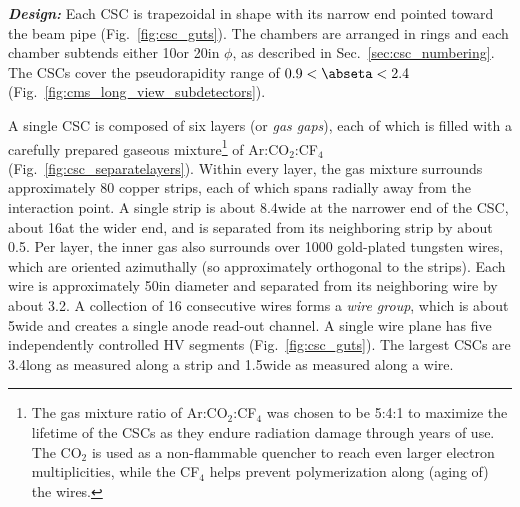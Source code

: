 \textit{\textbf{Design:}}
Each CSC is trapezoidal in shape with its narrow end pointed toward the beam pipe (Fig.~\ref{fig:csc_guts}).
The chambers are arranged in rings and each chamber subtends either 10\degrees or 20\degrees in $\phi$, as described in Sec.~\ref{sec:csc_numbering}.
The CSCs cover the pseudorapidity range of $0.9 < \abseta < 2.4$ (Fig.~\ref{fig:cms_long_view_subdetectors}).

A single CSC is composed of six layers (or \emph{gas gaps}), each of which is filled with a carefully prepared gaseous mixture\footnote{
    The gas mixture ratio of Ar:CO$_{2}$:CF$_{4}$ was chosen to be 5:4:1 to maximize the lifetime of the CSCs as they endure radiation damage through years of use.
    The CO$_{2}$ is used as a non-flammable quencher to reach even larger electron multiplicities, while the CF$_{4}$ helps prevent polymerization along (aging of) the wires.
    }
of Ar:CO$_{2}$:CF$_{4}$ (Fig.~\ref{fig:csc_separatelayers}).
Within every layer, the gas mixture surrounds approximately 80 copper strips, each of which spans radially away from the interaction point.
A single strip is about 8.4\mm wide at the narrower end of the CSC, about 16\mm at the wider end, and is separated from its neighboring strip by about 0.5\mm.
Per layer, the inner gas also surrounds over 1000 gold-plated tungsten wires, which are oriented azimuthally (so approximately orthogonal to the strips).
Each wire is approximately 50\mum in diameter and separated from its neighboring wire by about 3.2\mm.
A collection of 16 consecutive wires forms a \emph{wire group}, which is about 5\cm wide and creates a single anode read-out channel.
A single wire plane has five independently controlled HV segments (Fig.~\ref{fig:csc_guts}).
The largest CSCs are 3.4\meter long as measured along a strip and 1.5\meter wide as measured along a wire.
